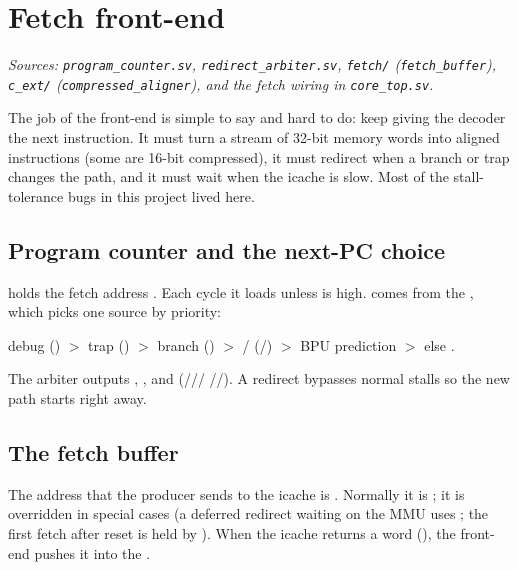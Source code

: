 \section{Fetch front-end}
\textit{Sources: \texttt{program\_counter.sv}, \texttt{redirect\_arbiter.sv},
\texttt{fetch/} (\texttt{fetch\_buffer}), \texttt{c\_ext/}
(\texttt{compressed\_aligner}), and the fetch wiring in \texttt{core\_top.sv}.}

The job of the front-end is simple to say and hard to do: keep giving the decoder
the next instruction. It must turn a stream of 32-bit memory words into aligned
instructions (some are 16-bit compressed), it must redirect when a branch or trap
changes the path, and it must wait when the icache is slow. Most of the
stall-tolerance bugs in this project lived here.


\subsection{Program counter and the next-PC choice}
 holds the fetch address . Each cycle it loads
 unless  is high.  comes from the
, which picks one source by priority:
\begin{center}\small
debug () $>$ trap () $>$ branch
() $>$ / (/) $>$ BPU
prediction $>$ else .
\end{center}
The arbiter outputs , , and
 (///
//). A redirect bypasses normal
stalls so the new path starts right away.

\subsection{The fetch buffer}
The address that the producer sends to the icache is . Normally it
is ; it is overridden in special cases (a deferred redirect waiting
on the MMU uses ; the first fetch after reset is held by
). When the icache returns a word
(), the front-end pushes it into the .

